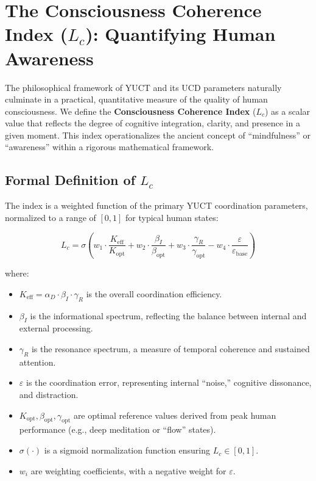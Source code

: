 \documentclass[12pt,a4paper]{article}
\begin{document}
	
	\section{The Consciousness Coherence Index (\(L_c\)): Quantifying Human Awareness}
	
	The philosophical framework of YUCT and its UCD parameters naturally culminate in a practical, quantitative measure of the quality of human consciousness. We define the \textbf{Consciousness Coherence Index} (\(L_c\)) as a scalar value that reflects the degree of cognitive integration, clarity, and presence in a given moment. This index operationalizes the ancient concept of ``mindfulness'' or ``awareness'' within a rigorous mathematical framework.
	
	\subsection{Formal Definition of \(L_c\)}
	
	The index is a weighted function of the primary YUCT coordination parameters, normalized to a range of \([0, 1]\) for typical human states:
	
	\begin{equation}
		L_c = \sigma\left( w_1 \cdot \frac{K_{\mathrm{eff}}}{K_{\mathrm{opt}}} + w_2 \cdot \frac{\beta_I}{\beta_{\mathrm{opt}}} + w_3 \cdot \frac{\gamma_R}{\gamma_{\mathrm{opt}}} - w_4 \cdot \frac{\varepsilon}{\varepsilon_{\mathrm{base}}} \right)
	\end{equation}
	
	where:
	\begin{itemize}
		\item \(K_{\mathrm{eff}} = \alpha_D \cdot \beta_I \cdot \gamma_R\) is the overall coordination efficiency.
		\item \(\beta_I\) is the informational spectrum, reflecting the balance between internal and external processing.
		\item \(\gamma_R\) is the resonance spectrum, a measure of temporal coherence and sustained attention.
		\item \(\varepsilon\) is the coordination error, representing internal ``noise,'' cognitive dissonance, and distraction.
		\item \(K_{\mathrm{opt}}, \beta_{\mathrm{opt}}, \gamma_{\mathrm{opt}}\) are optimal reference values derived from peak human performance (e.g., deep meditation or ``flow'' states).
		\item \(\sigma(\cdot)\) is a sigmoid normalization function ensuring \(L_c \in [0, 1]\).
		\item \(w_i\) are weighting coefficients, with a negative weight for \(\varepsilon\).
	\end{itemize}
	
\end{document}

